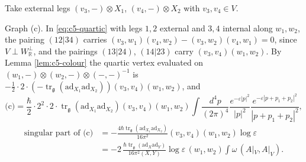\begin{example}
\label{ex:c5-cd}
Take external legs $(v_3,-)\otimes X_1$, $(v_4,-)\otimes X_2$ with $v_3,v_4\in V$.

Graph (c). In \eqref{eq:c5-quartic} with legs $1,2$ external and $3,4$ internal along $w_1,w_2$, the pairing $(12|34)$ carries $(v_3,w_1)(v_4,w_2)-(v_3,w_2)(v_4,w_1)=0$, since $V\perp W_{\mathbb R}^\perp$, and the pairings $(13|24)$, $(14|23)$ carry $(v_3,v_4)(w_1,w_2)$. By Lemma \ref{lem:c5-colour} the quartic vertex evaluated on $(w_1,-)\otimes(w_2,-)\otimes(-,-)^{-1}$ is $-\frac12\cdot2\cdot(-\operatorname{tr}_{\mathfrak g}(\mathrm{ad}_{X_1}\mathrm{ad}_{X_2}))(v_3,v_4)(w_1,w_2)$, and
\[
\text{(c)}=\frac\hbar2\cdot2^2\cdot2\cdot\operatorname{tr}_{\mathfrak g}(\mathrm{ad}_{X_1}\mathrm{ad}_{X_2})(v_3,v_4)(w_1,w_2)\int\frac{d^4p}{(2\pi)^4}\frac{e^{-\varepsilon|p|^2}}{|p|^2}\frac{e^{-\varepsilon|p+p_1+p_2|^2}}{|p+p_1+p_2|^2},
\]
\[
\begin{aligned}
\text{singular part of (c)}&=-\frac{4\hbar\operatorname{tr}_{\mathfrak g}(\mathrm{ad}_{X_1}\mathrm{ad}_{X_2})}{16\pi^2}(v_3,v_4)(w_1,w_2)\log\varepsilon\\
&=-2\,\frac{\hbar\operatorname{tr}_{\mathfrak g}(\mathrm{ad}_X\mathrm{ad}_Y)}{16\pi^2(X,Y)}\log\varepsilon\,(w_1,w_2)\int\omega\,(A|_V,A|_V).
\end{aligned}
\]


\end{example}
